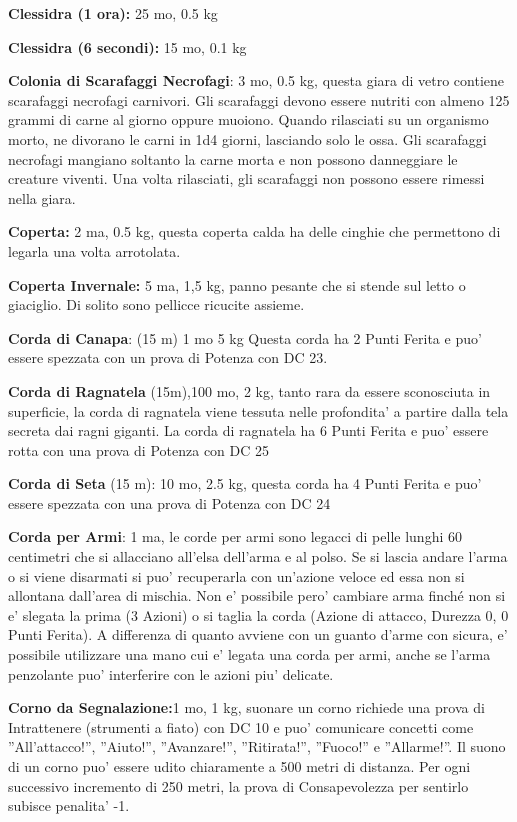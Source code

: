 \documentclass[a4paper,11pt,twoside,openany]{book}
\begin{document}
{\textbf{Clessidra (1 ora):} 25 mo, 0.5 kg

\textbf{Clessidra (6 secondi):} 15 mo, 0.1 kg

\textbf{Colonia di Scarafaggi Necrofagi}: 3 mo, 0.5 kg, questa giara di vetro contiene scarafaggi necrofagi carnivori. Gli scarafaggi devono essere nutriti con almeno 125 grammi di carne al giorno oppure muoiono. Quando rilasciati su un organismo morto, ne divorano le carni in 1d4 giorni, lasciando solo le ossa. Gli scarafaggi necrofagi mangiano soltanto la carne morta e non possono danneggiare le creature viventi. Una volta rilasciati, gli scarafaggi non possono essere rimessi nella giara.

\textbf{Coperta:} 2 ma, 0.5 kg, questa coperta calda ha delle cinghie che permettono di legarla una volta arrotolata.

\textbf{Coperta Invernale:} 5 ma, 1,5 kg, panno pesante che si stende sul letto o giaciglio. Di solito sono pellicce ricucite assieme.

\textbf{Corda di Canapa}: (15 m) 1 mo 5 kg Questa corda ha 2 Punti Ferita e puo' essere spezzata con un prova di Potenza con DC 23.

\textbf{Corda di Ragnatela} (15m),100 mo, 2 kg, tanto rara da essere sconosciuta in superficie, la corda di ragnatela viene tessuta nelle profondita’ a partire dalla tela secreta dai ragni giganti.
La corda di ragnatela ha 6 Punti Ferita e puo' essere rotta con una prova di Potenza con DC 25

\textbf{Corda di Seta} (15 m): 10 mo, 2.5 kg, questa corda ha 4 Punti Ferita e puo' essere spezzata con una prova di Potenza con DC 24

\textbf{Corda per Armi}: 1 ma, le corde per armi sono legacci di pelle lunghi 60 centimetri che si allacciano all’elsa dell’arma e al polso. Se si lascia andare l’arma o si viene disarmati si puo' recuperarla con un’azione veloce ed essa non si allontana dall’area di mischia. Non e' possibile pero' cambiare arma finché non si e' slegata la prima (3 Azioni) o si taglia la corda (Azione di attacco, Durezza 0, 0 Punti Ferita). A differenza di quanto avviene con un guanto d’arme con sicura, e' possibile utilizzare una mano cui e' legata una corda per armi, anche se l’arma penzolante puo' interferire con le azioni piu' delicate.

\textbf{Corno da Segnalazione:}1 mo, 1 kg, suonare un corno richiede una prova di Intrattenere (strumenti a fiato) con DC 10 e puo' comunicare concetti come ''All'attacco!'', ''Aiuto!'', ''Avanzare!'', ''Ritirata!'', ''Fuoco!'' e ''Allarme!''. Il suono di un corno puo' essere udito chiaramente a 500 metri di distanza. Per ogni successivo incremento di 250 metri, la prova di Consapevolezza per sentirlo subisce penalita' -1.

}
\end{document}
